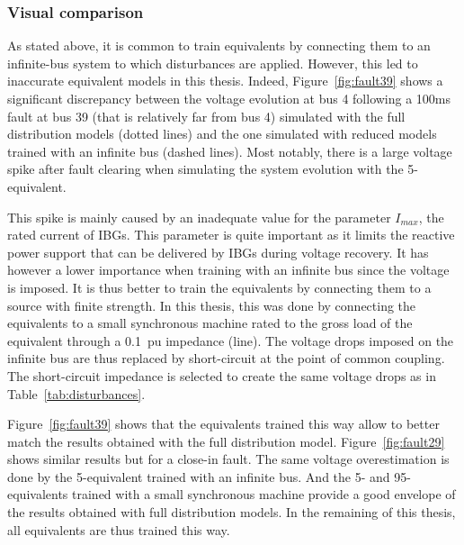 \subsubsection{Visual comparison}
\label{sec:isgt_results_visual}

As stated above, it is common to train equivalents by connecting them to an infinite-bus system to which disturbances are applied. However, this led to inaccurate equivalent models in this thesis. Indeed, Figure~\ref{fig:fault39} shows a significant discrepancy between the voltage evolution at bus 4 following a 100ms fault at bus 39 (that is relatively far from bus 4) simulated with the full distribution models (dotted lines) and the one simulated with reduced models trained with an infinite bus (dashed lines). Most notably, there is a large voltage spike after fault clearing when simulating the system evolution with the 5-equivalent.

This spike is mainly caused by an inadequate value for the parameter \(I_{max}\), the rated current of IBGs. This parameter is quite important as it limits the reactive power support that can be delivered by IBGs during voltage recovery. It has however a lower importance when training with an infinite bus since the voltage is imposed. It is thus better to train the equivalents by connecting them to a source with finite strength. In this thesis, this was done by connecting the equivalents to a small synchronous machine rated to the gross load of the equivalent through a 0.1~pu impedance (line). The voltage drops imposed on the infinite bus are thus replaced by short-circuit at the point of common coupling. The short-circuit impedance is selected to create the same voltage drops as in Table~\ref{tab:disturbances}.

Figure~\ref{fig:fault39} shows that the equivalents trained this way allow to better match the results obtained with the full distribution model. Figure~\ref{fig:fault29} shows similar results but for a close-in fault. The same voltage overestimation is done by the 5-equivalent trained with an infinite bus. And the 5- and 95- equivalents trained with a small synchronous machine provide a good envelope of the results obtained with full distribution models. In the remaining of this thesis, all equivalents are thus trained this way.



